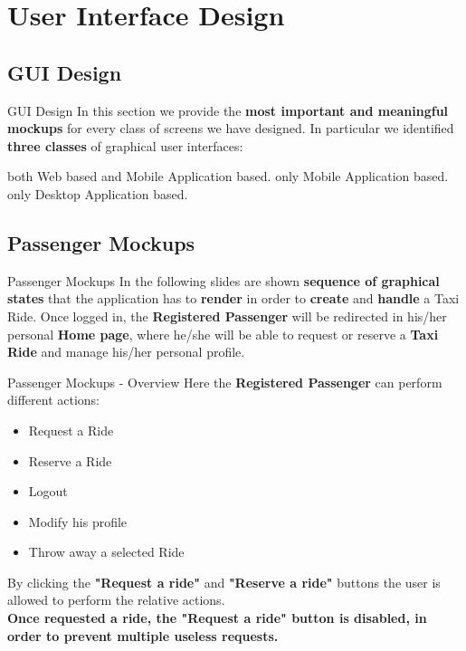 \documentclass{../common/latex_classes/pdf_presentation}
\begin{document}
	\section{User Interface Design}
	
	\subsection{GUI Design}
	
	\begin{frame}{GUI Design}
		In this section we provide the \textbf{most important and meaningful mockups} for every class of screens we have designed.
		In particular we identified \textbf{three classes} of graphical user interfaces:
		\begin{itemize}
			 both Web based and Mobile Application based.
			 only Mobile Application based.
			 only Desktop Application based.
		\end{itemize}
	\end{frame}

	\subsection{Passenger Mockups}
	\begin{frame}{Passenger Mockups}
		In the following slides are shown \textbf{sequence of graphical states} that the application has to \textbf{render} in order to \textbf{create} and \textbf{handle} a Taxi Ride.
		Once logged in, the \textbf{Registered Passenger} will be redirected in his/her personal \textbf{Home page}, where he/she will be able to request or reserve a \textbf{Taxi Ride} and manage his/her personal profile.
	\end{frame}
	
	\begin{frame} {Passenger Mockups - Overview}
		Here the \textbf{Registered Passenger} can perform different actions:
		\begin{itemize}
			\item Request a Ride
			\item Reserve a Ride
			\item Logout
			\item Modify his profile
			\item Throw away a selected Ride
		\end{itemize}
		By clicking the \textbf{"Request a ride"} and \textbf{"Reserve a ride"} buttons the user is allowed to perform the relative actions.\\
		\textbf{Once requested a ride, the "Request a ride" button is disabled, in order to prevent multiple useless requests.}
	\end{frame}
	
\end{document}
